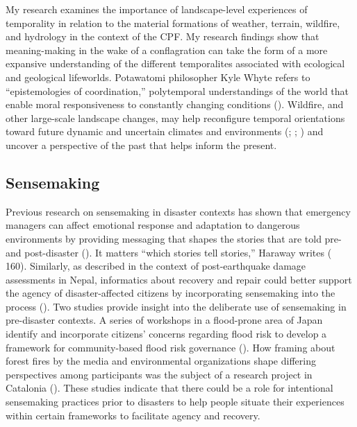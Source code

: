\documentclass[
]{article}
\begin{document}
My research examines the importance of landscape-level experiences of temporality in relation to the material formations of weather, terrain, wildfire, and hydrology in the context of the CPF. My research findings show that meaning-making in the wake of a conflagration can take the form of a more expansive understanding of the different temporalites associated with ecological and geological lifeworlds. Potawatomi philosopher Kyle Whyte refers to ``epistemologies of coordination,'' polytemporal understandings of the world that enable moral responsiveness to constantly changing conditions (). Wildfire, and other large-scale landscape changes, may help reconfigure temporal orientations toward future dynamic and uncertain climates and environments (; ; ) and uncover a perspective of the past that helps inform the present.

\subsection{Sensemaking}\label{sensemaking}

Previous research on sensemaking in disaster contexts has shown that emergency managers can affect emotional response and adaptation to dangerous environments by providing messaging that shapes the stories that are told pre- and post-disaster (). It matters ``which stories tell stories,'' Haraway writes ( 160). Similarly, as described in the context of post-earthquake damage assessments in Nepal, informatics about recovery and repair could better support the agency of disaster-affected citizens by incorporating sensemaking into the process (). Two studies provide insight into the deliberate use of sensemaking in pre-disaster contexts. A series of workshops in a flood-prone area of Japan identify and incorporate citizens' concerns regarding flood risk to develop a framework for community-based flood risk governance (). How framing about forest fires by the media and environmental organizations shape differing perspectives among participants was the subject of a research project in Catalonia (). These studies indicate that there could be a role for intentional sensemaking practices prior to disasters to help people situate their experiences within certain frameworks to facilitate agency and recovery.
\end{document}
